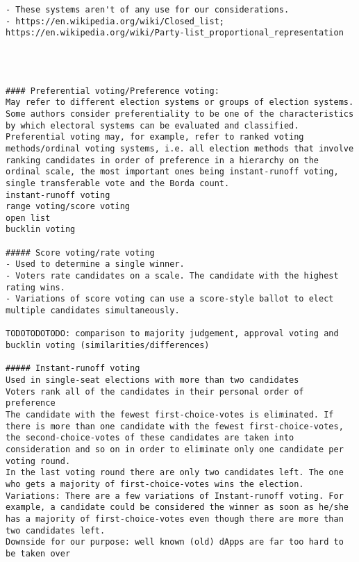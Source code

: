 {{\begin{verbatim}
- These systems aren't of any use for our considerations. 
- https://en.wikipedia.org/wiki/Closed_list; https://en.wikipedia.org/wiki/Party-list_proportional_representation




#### Preferential voting/Preference voting: 
May refer to different election systems or groups of election systems. Some authors consider preferentiality to be one of the characteristics by which electoral systems can be evaluated and classified. 
Preferential voting may, for example, refer to ranked voting methods/ordinal voting systems, i.e. all election methods that involve ranking candidates in order of preference in a hierarchy on the ordinal scale, the most important ones being instant-runoff voting, single transferable vote and the Borda count. 
instant-runoff voting
range voting/score voting
open list
bucklin voting

##### Score voting/rate voting 
- Used to determine a single winner. 
- Voters rate candidates on a scale. The candidate with the highest rating wins.  
- Variations of score voting can use a score-style ballot to elect multiple candidates simultaneously.

TODOTODOTODO: comparison to majority judgement, approval voting and bucklin voting (similarities/differences)

##### Instant-runoff voting 
Used in single-seat elections with more than two candidates 
Voters rank all of the candidates in their personal order of preference
The candidate with the fewest first-choice-votes is eliminated. If there is more than one candidate with the fewest first-choice-votes, the second-choice-votes of these candidates are taken into consideration and so on in order to eliminate only one candidate per voting round. 
In the last voting round there are only two candidates left. The one who gets a majority of first-choice-votes wins the election. 
Variations: There are a few variations of Instant-runoff voting. For example, a candidate could be considered the winner as soon as he/she has a majority of first-choice-votes even though there are more than two candidates left. 
Downside for our purpose: well known (old) dApps are far too hard to be taken over


\end{verbatim}}}
